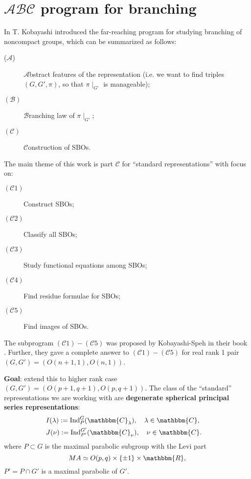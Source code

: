 \documentclass[12pt]{article} %
\newcommand{\assign}{:=}
\newcommand{\tmop}[1]{\ensuremath{\operatorname{#1}}}
\theoremstyle{definition}
\theoremstyle{exampstyle} \newtheorem{examp}[theorem]{Theorem}
\newcommand{\tmtextbf}[1]{{\bfseries{#1}}}
\begin{document}
\section{$\mathcal{A}\mathcal{B}\mathcal{C}$ program for branching}

In {\cite{kobayashi2015program}} T. Kobayashi introduced the far-reaching
program for studying branching of noncompact groups, which can be summarized
as follows:
\begin{description}
  \item[($\mathcal{A}$)] $\mathcal{A}$bstract features of the representation
  (i.e. we want to find triples $(G, G', \pi)$, so that $\pi\!\mid_{G'}$ is
  manageable);
  
  \item[$(\mathcal{B})$] $\mathcal{B}$ranching law of $\pi\!\mid_{G'}$;
  
  \item[$(\mathcal{C})$] $\mathcal{C}$onstruction of SBOs.
\end{description}
The main theme of this work is part $\mathcal{C}$ for ``standard
representations'' with focus on:
\begin{description}
  \item[$(\mathcal{C}1)$] Construct SBOs;
  
  \item[$(\mathcal{C}2)$] Classify all SBOs;
  
  \item[$(\mathcal{C}3)$] Study functional equations among SBOs;
  
  \item[$(\mathcal{C}4)$] Find residue formulae for SBOs;
  
  \item[$(\mathcal{C}5)$] Find images of SBOs.
\end{description}
The subprogram $(\mathcal{C}1) - (\mathcal{C}5)$ was proposed by
Kobayashi-Speh in their book {\cite{kobayashi2015symmetry}}. Further, they
gave a complete answer to $(\mathcal{C}1) - (\mathcal{C}5)$ for real rank 1
pair $(G, G') = (O (n + 1, 1), O (n, 1))$.

\tmtextbf{Goal}: extend this to higher rank case $(G, G') = (O (p + 1, q + 1),
O (p, q + 1))$. The class of the ``standard'' representations we are working
with are \tmtextbf{degenerate spherical principal series representations}:
\begin{eqnarray}
  & I (\lambda) \assign \tmop{Ind}_P^G (\mathbbm{C}_{\lambda}), \quad \lambda
  \in \mathbbm{C}, &  \nonumber\\
  & J (\nu) \assign \tmop{Ind}_{P'}^{G'} (\mathbbm{C}_{\nu}), \quad \nu \in
  \mathbbm{C}. &  \nonumber
\end{eqnarray}
where $P \subset G$ is the maximal parabolic subgroup with the Levi part
\[ M A \simeq O (p, q) \times \{ \pm 1 \} \times \mathbbm{R}, \]
$P' = P \cap G'$ is a maximal parabolic of $G'$.
\end{document}
